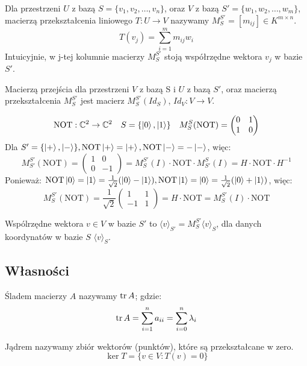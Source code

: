 \documentclass{../notatki}
\begin{document}
Dla przestrzeni $U$ z bazą $S = \{v_1, v_2, \dots, v_n\}$, oraz $V$ z
bazą $S' = \{w_1, w_2, \dots, w_m\}$, macierzą przekształcenia liniowego
$T: U \to V$ nazywamy $M_S^{S'} = [m_{ij}] \in K^{m \times n}$.
$$
T(v_j) = \sum_{i=1}^m m_{ij} w_i
$$
Intuicyjnie, w j-tej kolumnie macierzy $M_S^{S'}$ stoją współrzędne wektora
$v_j$ w bazie $S'$.

Macierzą przejścia dla przestrzeni $V$ z bazą S i $U$ z bazą $S'$,
oraz macierzą przekształcenia $M_S^{S'}$ jest macierz
$M_S^{S'}(Id_S)$, $Id_V : V \to V$.

\begin{examplebox}
  $$
  \textrm{NOT}: \mathbb{C}^2 \to \mathbb{C}^2 \quad S = \{\ket{0},
  \ket{1}\} \quad M_S^S(\textrm{NOT}) =
  \begin{pmatrix}
    0 & 1 \\
    1 & 0
  \end{pmatrix}
  $$
  Dla $S' = \{\ket{+}, \ket{-}\}, \textrm{NOT}\ket{+} = \ket{+},
  \textrm{NOT}\ket{-} =
  -\ket{-}$, więc:
  $$
  M_{S'}^{S'}(\textrm{NOT}) =
  \begin{pmatrix}
    1 & 0 \\
    0 & -1
  \end{pmatrix} = M_S^{S'}(I) \cdot \textrm{NOT} \cdot M_{S'}^{S}(I)
  = H \cdot \textrm{NOT} \cdot H^{-1}
  $$
  Ponieważ: $\textrm{NOT}\ket{0} = \ket{1} =
  \frac{1}{\sqrt{2}}(\ket{0} - \ket{1}), \textrm{NOT}\ket{1} =
  \ket{0} = \frac{1}{\sqrt{2}}(\ket{0} + \ket{1})$, więc:
  $$
  M_S^{S'}(\textrm{NOT}) =
  \frac{1}{\sqrt{2}}
  \begin{pmatrix}
    1 & 1 \\
    -1 & 1
  \end{pmatrix} = H \cdot \textrm{NOT} = M_S^{S'}(I) \cdot \textrm{NOT}
  $$
\end{examplebox}

Wspólrzędne wektora $v \in V$ w bazie $S'$ to $\langle v \rangle_{S'}
= M_S^{S'} \langle v \rangle_S$, dla danych koordynatów w bazie $S$
$\langle v \rangle_S$.

\subsection{Własności}

Śladem macierzy $A$ nazywamy $\tr A$; gdzie:
$$
\tr A = \sum_{i=1}^n a_{ii} = \sum_{i=0}^{n} \lambda_i
$$

Jądrem nazywamy zbiór wektorów (punktów), które są przekształcane w zero.
$$
\ker T = \{v \in V: T(v) = 0\}
$$
\end{document}
